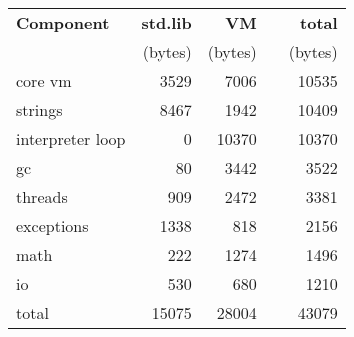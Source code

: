 \begin{tabular}{l|r|r|cr}
    \hline
    \bfseries Component   & \bfseries std.lib & \bfseries VM & & \bfseries total \\
                          & (bytes)                   & (bytes)              & & (bytes)  \\
    \hline\hline
    core vm               &  3529                     &  7006                & &           10535 \\
    strings               &  8467                     &  1942                & &           10409 \\
    interpreter loop      &     0                     & 10370                & &           10370 \\
    gc                    &    80                     &  3442                & &            3522 \\
    threads               &   909                     &  2472                & &            3381 \\
    exceptions            &  1338                     &   818                & &            2156 \\
    math                  &   222                     &  1274                & &            1496 \\
    io                    &   530                     &   680                & &            1210 \\
    total                 & 15075                     & 28004                & &           43079 \\
     \hline
\end{tabular}